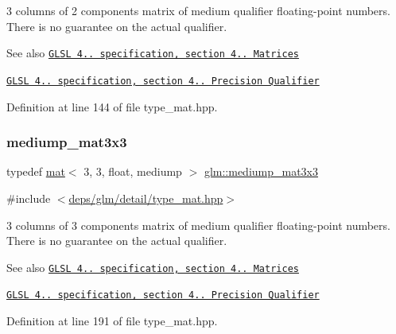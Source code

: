 3 columns of 2 components matrix of medium qualifier floating-\/point numbers. There is no guarantee on the actual qualifier.

\begin{DoxySeeAlso}{See also}
\href{http://www.opengl.org/registry/doc/GLSLangSpec.4.20.8.pdf}{\tt G\+L\+SL 4.. specification, section 4.. Matrices} 

\href{http://www.opengl.org/registry/doc/GLSLangSpec.4.20.8.pdf}{\tt G\+L\+SL 4.. specification, section 4.. Precision Qualifier} 
\end{DoxySeeAlso}


Definition at line 144 of file type\+\_\+mat.\+hpp.

\mbox{\label{group__core__precision_ga774bbcb2f667fc0a91add50e55d8ac04}} 
\subsubsection{\texorpdfstring{mediump\+\_\+mat3x3}{mediump\_mat3x3}}
{\footnotesize\ttfamily typedef \hyperlink{structglm_1_1mat}{mat}$<$ 3, 3, float, mediump $>$ \hyperlink{group__core__precision_ga774bbcb2f667fc0a91add50e55d8ac04}{glm\+::mediump\+\_\+mat3x3}}



{\ttfamily \#include $<$\hyperlink{type__mat_8hpp}{deps/glm/detail/type\+\_\+mat.\+hpp}$>$}

3 columns of 3 components matrix of medium qualifier floating-\/point numbers. There is no guarantee on the actual qualifier.

\begin{DoxySeeAlso}{See also}
\href{http://www.opengl.org/registry/doc/GLSLangSpec.4.20.8.pdf}{\tt G\+L\+SL 4.. specification, section 4.. Matrices} 

\href{http://www.opengl.org/registry/doc/GLSLangSpec.4.20.8.pdf}{\tt G\+L\+SL 4.. specification, section 4.. Precision Qualifier} 
\end{DoxySeeAlso}


Definition at line 191 of file type\+\_\+mat.\+hpp.

\mbox{\label{group__core__precision_ga61dd8c2c7fd60c1343a6b3aca7f86c25}} 
